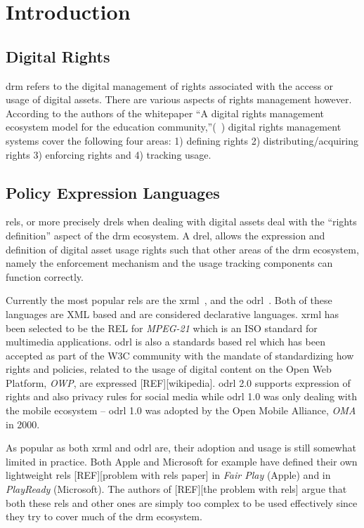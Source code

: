 \chapter{Introduction}

\section{Digital Rights} 

\ac{drm} refers to the digital management of rights associated with the access or usage of digital assets. There are various aspects of rights management however. According to the authors of the whitepaper ``A digital rights management ecosystem model for the education community,''(~\cite{collier})
 digital rights management systems cover the following four areas: 1) defining rights 2) distributing/acquiring rights 3) enforcing rights and 4) tracking usage.

\section{Policy Expression Languages}

\ac{rel}s, or more precisely \ac{drel}s when dealing with digital assets deal with the ``rights definition'' aspect of the \ac{drm} ecosystem. A \ac{drel}, allows the expression and definition of digital asset usage rights such that other areas of the \ac{drm} ecosystem, namely the enforcement mechanism and the usage tracking components can function correctly.

Currently the most popular \ac{rel}s are the \ac{xrml}~\cite{Wang}, and the \ac{odrl}~\cite{odrloneone}. Both of these languages are XML based and are considered declarative languages. \ac{xrml} has been selected to be the REL for \emph{MPEG-21} which is an ISO standard for multimedia applications. \ac{odrl} is also a standards based \ac{rel} which has been accepted as part of the W3C community with the mandate of standardizing how rights and policies, related to the usage of digital content on the Open Web Platform, \emph{OWP}, are expressed [REF][wikipedia]. \ac{odrl} 2.0 supports expression of rights and also privacy rules for social media while \ac{odrl} 1.0 was only dealing with the mobile ecosystem -- \ac{odrl} 1.0 was adopted by the Open Mobile Alliance, \emph{OMA} in 2000.

As popular as both \ac{xrml} and \ac{odrl} are, their adoption and usage is still somewhat limited in practice. Both Apple and Microsoft for example have defined their own lightweight \ac{rel}s [REF][problem with \ac{rel}s paper] in \emph{Fair Play} (Apple) and in \emph{PlayReady} (Microsoft). The authors of [REF][the problem with \ac{rel}s] argue that both these \ac{rel}s and other ones are simply too complex to be used effectively since they try to cover much of the \ac{drm} ecosystem. 

